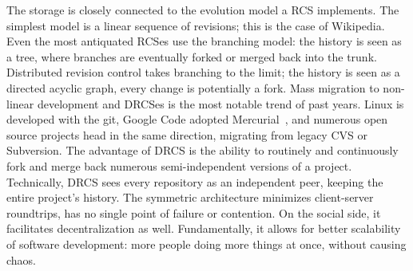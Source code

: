 \documentclass{acm_proc_article-sp}
\begin{document}
The storage is closely connected to the evolution model a RCS implements.
The simplest model is a linear sequence of revisions; this is the case of Wikipedia.
Even the most antiquated RCSes use the branching model: the history is seen as a tree, where branches are eventually forked or merged back into the trunk.
Distributed revision control takes branching to the limit; the history is seen as a directed acyclic graph, every change is potentially a fork.
Mass migration to non-linear development and DRCSes is the most notable trend of past years.
Linux is developed with the git, Google Code adopted Mercurial~\cite{mercurial}, and numerous open source projects head in the same direction, migrating from legacy CVS or Subversion.
The advantage of DRCS is the ability to routinely and continuously fork and merge back numerous semi-independent versions of a project.
Technically, DRCS sees every repository as an independent peer, keeping the entire project's history. The symmetric architecture minimizes client-server roundtrips, has no single point of failure or contention.
On the social side, it facilitates decentralization as well.
Fundamentally, it allows for better scalability of software development: more people doing more things at once, without causing chaos.
\end{document}
